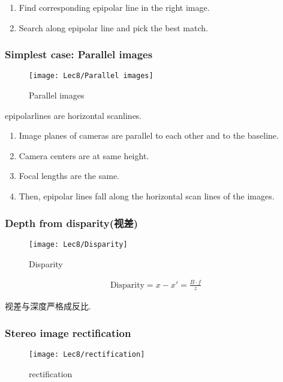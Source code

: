 \begin{enumerate}
    \item Find corresponding epipolar line in the right image. 
    \item Search along epipolar line and pick the best match. 
\end{enumerate}

\subsubsection{Simplest case: Parallel images}

\begin{figure}[H]
    \centering
    \texttt{[image: Lec8/Parallel images]}
    \caption{Parallel images}
\end{figure}

epipolarlines are horizontal scanlines. 
\begin{enumerate}
    \item Image planes of cameras are
    parallel to each other and to
    the baseline. 
    \item Camera centers are at same
    height. 
    \item Focal lengths are the same. 
    \item Then, epipolar lines fall along the horizontal scan lines of the images. 
\end{enumerate}

\subsubsection{Depth from disparity(视差)}

\begin{figure}[H]
    \centering
    \texttt{[image: Lec8/Disparity]}
    \caption{Disparity}
\end{figure}

\begin{align*}
    \text{Disparity}=x-x'=\frac{B\cdot  f}{z}
\end{align*}

视差与深度严格成反比. 

\subsubsection{Stereo image rectification}

\begin{figure}[H]
    \centering
    \texttt{[image: Lec8/rectification]}
    \caption{rectification}
\end{figure}

